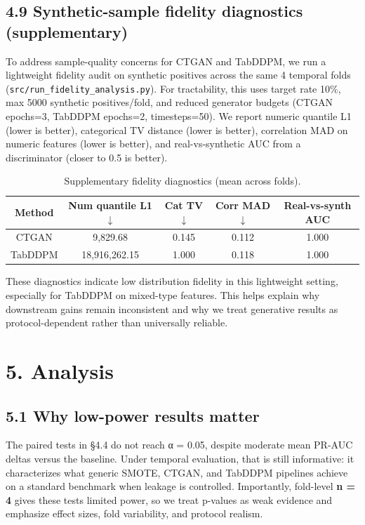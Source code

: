 \documentclass[sigconf]{acmart}
\begin{document}
{{{{{{{\subsection{4.9 Synthetic-sample fidelity diagnostics (supplementary)}

To address sample-quality concerns for CTGAN and TabDDPM, we run a lightweight fidelity audit on synthetic positives across the same 4 temporal folds (\texttt{src/run_fidelity_analysis.py}). For tractability, this uses target rate 10\%, max 5000 synthetic positives/fold, and reduced generator budgets (CTGAN epochs=3, TabDDPM epochs=2, timesteps=50). We report numeric quantile L1 (lower is better), categorical TV distance (lower is better), correlation MAD on numeric features (lower is better), and real-vs-synthetic AUC from a discriminator (closer to 0.5 is better).

\begin{table}[t]
\centering
\caption{Supplementary fidelity diagnostics (mean across folds).}
\begin{tabular}{ccccc}
\toprule
Method & Num quantile L1 $\downarrow$ & Cat TV $\downarrow$ & Corr MAD $\downarrow$ & Real-vs-synth AUC \\
\midrule
CTGAN & 9,829.68 & 0.145 & 0.112 & 1.000 \\
TabDDPM & 18,916,262.15 & 1.000 & 0.118 & 1.000 \\
\bottomrule
\end{tabular}
\end{table}

These diagnostics indicate low distribution fidelity in this lightweight setting, especially for TabDDPM on mixed-type features. This helps explain why downstream gains remain inconsistent and why we treat generative results as protocol-dependent rather than universally reliable.


\section{5. Analysis}

\subsection{5.1 Why low-power results matter}

The paired tests in §4.4 do not reach α = 0.05, despite moderate mean PR-AUC deltas versus the baseline. Under temporal evaluation, that is still informative: it characterizes what generic SMOTE, CTGAN, and TabDDPM pipelines achieve on a standard benchmark when leakage is controlled. Importantly, fold-level \textbf{n = 4} gives these tests limited power, so we treat p-values as weak evidence and emphasize effect sizes, fold variability, and protocol realism.

}}}}}}}
\end{document}
